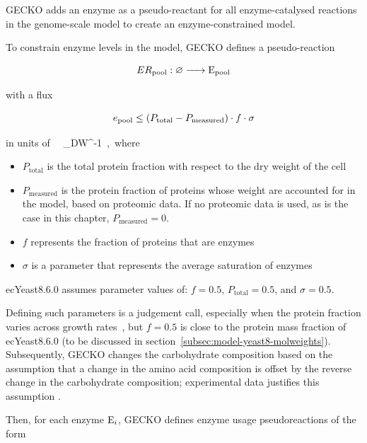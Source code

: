 GECKO adds an enzyme as a pseudo-reactant for all enzyme-catalysed reactions in the genome-scale model to create an enzyme-constrained model.

To constrain enzyme levels in the model, GECKO defines a pseudo-reaction

\begin{equation}
  ER_{\mathrm{pool}}: \varnothing \ce{ -> E_{pool} }
  \label{eq:model-gecko-enzyme-pool}
\end{equation}

with a flux

\begin{equation}
  e_{\mathrm{pool}} \leq (P_{\mathrm{total}} - P_{\mathrm{measured}}) \cdot f \cdot \sigma
  \label{eq:model-gecko-enzyme-pool-flux}
\end{equation}

in units of \SI{}{\gram~\gram_{DW}^{-1}}, where

\begin{itemize}
  \item $P_{\mathrm{total}}$ is the total protein fraction with respect to the dry weight of the cell
  \item $P_{\mathrm{measured}}$ is the protein fraction of proteins whose weight are accounted for in the model, based on proteomic data.
        If no proteomic data is used, as is the case in this chapter, $P_{\mathrm{measured}} = 0$.
  \item $f$ represents the fraction of proteins that are enzymes
  \item $\sigma$ is a parameter that represents the average saturation of enzymes
\end{itemize}

ecYeast8.6.0 assumes parameter values of: $f = 0.5$, $P_{\mathrm{total}} = 0.5$, and $\sigma = 0.5$.

Defining such parameters is a judgement call, especially when the protein fraction varies across growth rates~\parencite{elsemmanWholecellModelingYeast2022}, but $f = 0.5$ is close to the protein mass fraction of ecYeast8.6.0 (to be discussed in section~\ref{subsec:model-yeast8-molweights}).
Subsequently, GECKO changes the carbohydrate composition based on the assumption that a change in the amino acid composition is offset by the reverse change in the carbohydrate composition;
experimental data justifies this assumption \parencite{nissenFluxDistributionsAnaerobic1997}.

Then, for each enzyme $\ce{E_{i}}$, GECKO defines enzyme usage pseudoreactions of the form

